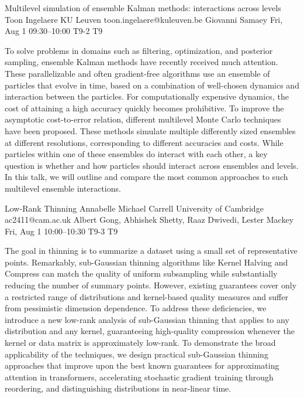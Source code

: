 \begin{talk}
  {Multilevel simulation of ensemble Kalman methods: interactions across levels}%
  {Toon Ingelaere}%
  {KU Leuven}%
  {toon.ingelaere@kuleuven.be}%
  {Giovanni Samaey}%
  {}%
  {Fri, Aug 1 09:30--10:00}%
  {T9-2}%
  {T9}%
  
    

        To solve problems in domains such as filtering, optimization, and posterior sampling,
        ensemble Kalman methods have recently received much attention. These parallelizable and often gradient-free algorithms use an ensemble of particles that evolve in time, based on a combination of well-chosen dynamics and interaction between the particles. For computationally expensive dynamics, the cost of attaining a high accuracy quickly becomes prohibitive. To improve the asymptotic cost-to-error relation, different multilevel Monte Carlo techniques have been proposed. These methods simulate multiple differently sized ensembles at different resolutions, corresponding to different accuracies and costs. While particles within one of these ensembles do interact with each other, a key question is whether and how particles should interact across ensembles and levels.
        In this talk, we will outline and compare the most common approaches to such multilevel ensemble interactions.

\medskip

\end{talk}

\begin{talk}
  {Low-Rank Thinning}%
  {Annabelle Michael Carrell}%
  {University of Cambridge}%
  {ac2411@cam.ac.uk}%
  {Albert Gong, Abhishek Shetty, Raaz Dwivedi, Lester Mackey}%
  {}%
  {Fri, Aug 1 10:00--10:30}%
  {T9-3}%
  {T9}%
  
    
   
The goal in thinning is to summarize a dataset using a small set of representative points. Remarkably, sub-Gaussian thinning algorithms like Kernel Halving and Compress can match the quality of uniform subsampling while substantially reducing the number of summary points. However, existing guarantees cover only a restricted range of distributions and kernel-based quality measures and suffer from pessimistic dimension dependence. To address these deficiencies, we introduce a new low-rank analysis of sub-Gaussian thinning that applies to any distribution and any kernel, guaranteeing high-quality compression whenever the kernel or data matrix is approximately low-rank. To demonstrate the broad applicability of the techniques, we design practical sub-Gaussian thinning approaches that improve upon the best known guarantees for approximating attention in transformers, accelerating stochastic gradient training through reordering, and distinguishing distributions in near-linear time. 

\medskip

\end{talk}

